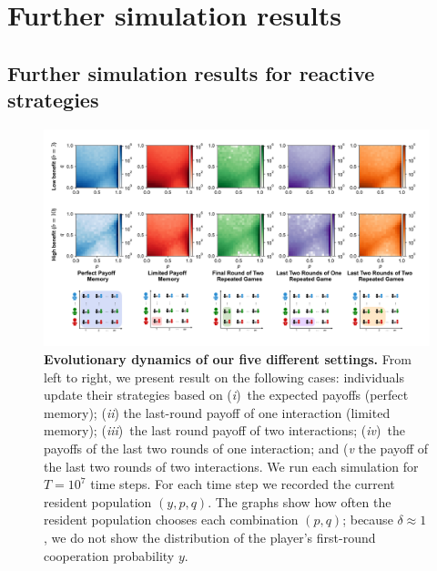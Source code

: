 \documentclass[11pt]{article}
\theoremstyle{plainCl1}
\theoremstyle{plainCl2}
\begin{document}
\clearpage




\section{Further simulation results}
\label{section:furthersimulations}


\subsection{Further simulation results for reactive strategies}\label{section:simulation_results}

\begin{figure}[t!]
    \centering 
    \includegraphics[width=\textwidth]{static/more_memory_heatmaps_donation_game_with_illustrations.pdf}
    \caption{\textbf{Evolutionary dynamics of our five different settings.}
    From left to right, we present result on the following cases: individuals update their strategies based on
    ({\it i})~the expected payoffs (perfect memory); ({\it ii}) the last-round payoff
    of one interaction (limited memory); ({\it iii})~the last round payoff of two
    interactions; ({\it iv})~the payoffs of the last two rounds of one interaction; 
    and ({\it v} the payoff of the last two rounds of two interactions. We run each simulation for \(T
    = 10^7\) time steps. For each time step we recorded the current resident
    population \((y, p, q)\). The graphs show how often the
    resident population chooses each combination \((p, q)\); because $\delta\!\approx\!1$, we do not show the distribution of the player's first-round cooperation probability $y$.}\label{fig:expected_payoffs_results}
    \end{figure}
\end{document}
